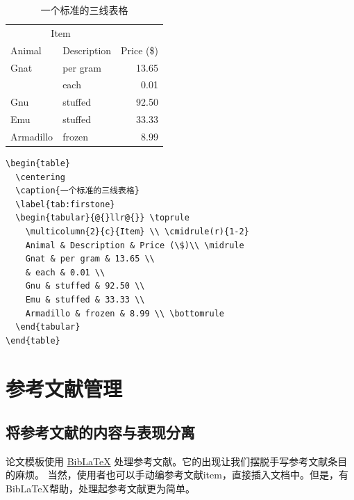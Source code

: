 \begin{table}
  \centering
  \caption{一个标准的三线表格}
  \label{tab:firstone}
  \begin{tabular}{@{}llr@{}} \toprule
    \multicolumn{2}{c}{Item} \\ \cmidrule(r){1-2}
    Animal & Description & Price (\$)\\ \midrule
    Gnat & per gram & 13.65 \\
    & each & 0.01 \\
    Gnu & stuffed & 92.50 \\
    Emu & stuffed & 33.33 \\
    Armadillo & frozen & 8.99 \\ \bottomrule
  \end{tabular}
\end{table}

\begin{lstlisting}[language={[LaTeX]TeX}, caption={三线表格}, label=demo-table3]
\begin{table}
  \centering
  \caption{一个标准的三线表格}
  \label{tab:firstone}
  \begin{tabular}{@{}llr@{}} \toprule
    \multicolumn{2}{c}{Item} \\ \cmidrule(r){1-2}
    Animal & Description & Price (\$)\\ \midrule
    Gnat & per gram & 13.65 \\
    & each & 0.01 \\
    Gnu & stuffed & 92.50 \\
    Emu & stuffed & 33.33 \\
    Armadillo & frozen & 8.99 \\ \bottomrule
  \end{tabular}
\end{table}
\end{lstlisting}


\section{参考文献管理}
\label{sec:reference}
\subsection{将参考文献的内容与表现分离}

\BIThesis{}论文模板使用 \href{https://www.ctan.org/pkg/biblatex}{BibLaTeX} 处理参考文献。它的出现让我们摆脱手写参考文献条目
的麻烦。
当然，使用者也可以手动编参考文献item，直接插入文档中。但是，有BibLaTeX帮助，处理起参考文献更为简单。

